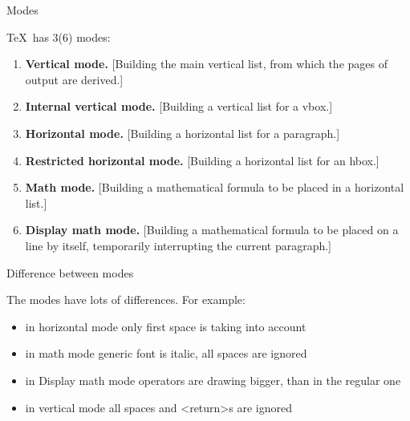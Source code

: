 \begin{frame}{Modes}\relax

\TeX\ has 3(6) modes:
\begin{enumerate}
    \item {\bfseries {\csk Vertical} mode.} [Building the main vertical list, from which the pages of
output are derived.]
\item {\bfseries Internal {\csk vertical} mode.} [Building a vertical list for a vbox.]
\item {\bfseries {\csk Horizontal} mode.} [Building a horizontal list for a paragraph.]
\item {\bfseries Restricted {\csk horizontal} mode.} [Building a horizontal list for an hbox.]
\item {\bfseries {\csk Math} mode.} [Building a mathematical formula to be placed in a horizontal list.]
\item {\bfseries Display {\csk math} mode.} [Building a mathematical formula to be placed on
a line by itself, temporarily interrupting the current paragraph.]
     
\end{enumerate}
     
\end{frame}

\begin{frame}{Difference between modes}

    The modes have lots of differences. For example:
    \begin{itemize}
        \item in horizontal mode only first space is taking into account
        \item in math mode generic font is italic, all spaces are ignored
        \item in Display math mode operators are drawing bigger, than in the regular one 
        \item in vertical mode all spaces and <return>s are ignored 
         
    \end{itemize}
\end{frame}

